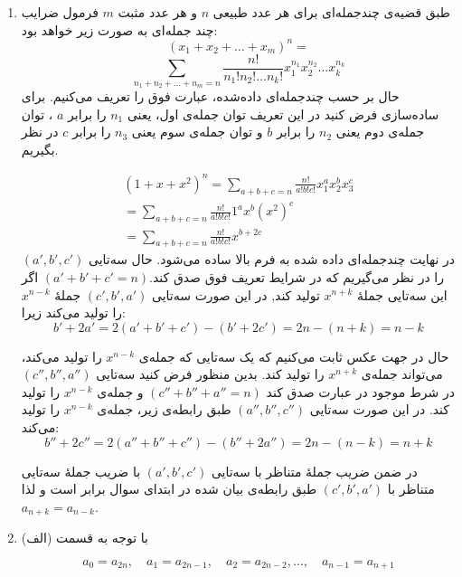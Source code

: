 	\begin{enumerate}
		\item 
        \p
        طبق قضیه‌ی چندجمله‌ای برای هر عدد
         طبیعی 
         $n$
         و هر عدد مثبت 
         $m$ 
         فرمول ضرایب چند جمله‌ای به صورت زیر خواهد بود:
        $$(x_1+x_2+\ldots+x_m)^n = $$
        $$\sum_{n_1+n_2+\ldots+n_m=n} \frac{n!}{n_1!n_2!\ldots n_k!} x_1^{n_1}x_2^{n_2}\ldots x_k^{n_k}$$
        حال بر حسب چندجمله‌ای داده‌شده، عبارت فوق را تعریف می‌کنیم. برای ساده‌سازی فرض کنید در این تعریف توان جمله‌ی اول، یعنی
        $n_1$
        را برابر $a$ ،
        توان جمله‌ی دوم یعنی 
        $n_2$
        را برابر 
        $b$
        و توان جمله‌ی سوم یعنی
        $n_3$
        را برابر $c$ در نظر بگیریم.
        
        \begin{align*}
		(1+x+x^2)^n = \sum_{a+b+c=n} \frac{n!}{a!b!c!} x_1^{a} x_2^{b} x_3^{c}\\
		= \sum_{a+b+c=n} \frac{n!}{a!b!c!} 1^{a} x^{b} (x^2)^{c}\\
		= \sum_{a+b+c=n} \frac{n!}{a!b!c!} x^{b + 2c}
        \end{align*}
		در نهایت چندجمله‌ای داده شده به فرم بالا ساده می‌شود.
		حال سه‌تایی $(a',b',c')$ را در نظر می‌گیریم که در شرایط تعریف فوق صدق کند.$(a'+b'+c' = n)$
        اگر این سه‌تایی  جملهٔ $x^{n + k}$ تولید کند, در این صورت سه‌تایی $(c', b', a')$ جملهٔ $x^{n - k}$ را تولید می‌کند زیرا:
        $$b' + 2a' = 2(a' + b' + c') - (b' + 2c') = 2n - (n + k) = n -k$$
        
        \p
        حال در جهت عکس ثابت می‌کنیم که یک سه‌تایی که جمله‌ی
        $x^{n-k}$
        را تولید می‌کند، می‌تواند جمله‌ی
        $x^{n+k}$
        را تولید کند. بدین منظور فرض کنید سه‌تایی
        $(c'', b'', a'')$
        در شرط موجود در عبارت صدق کند
        $(c''+b''+a''=n)$
        و جمله‌ی
        $x^{n-k}$
        را تولید کند.
        در این صورت سه‌تایی
        $(a'',b'',c'')$
        طبق رابطه‌ی زیر، جمله‌ی 
        $x^{n-k}$
        را تولید می‌کند:
    	$$b'' + 2c'' = 2(a'' + b'' + c'') - (b'' + 2a'') = 2n - (n - k) = n +k$$
	
        \p
    	در ضمن ضریب جملهٔ متناظر با سه‌تایی $(a', b', c')$ با ضریب جملهٔ سه‌تایی متناظر با $(c', b', a')$ طبق رابطه‌ی بیان شده در ابتدای سوال برابر است و لذا $a_{n + k} = a_{n - k}$.
	
	\item
        \p
    	با توجه به قسمت (الف) 
    
    	$$a_0 = a_{2n},\quad a_1 = a_{2n - 1},\quad a_2 = a_{2n - 2}, \dots ,\quad a_{n - 1} = a_{n + 1}$$
    

\end{enumerate}
